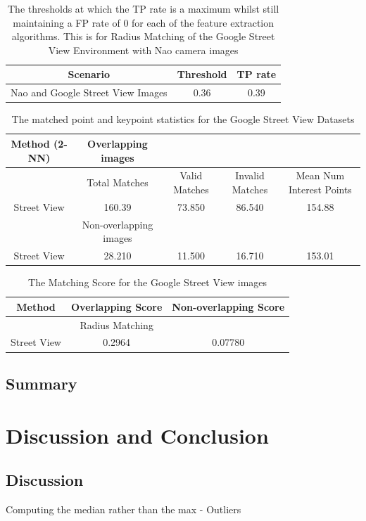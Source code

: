\documentclass[11pt]{report}
\begin{document}
\begin{table}
\caption{The thresholds at which the TP rate is a maximum whilst still maintaining
a FP rate of 0 for each of the feature extraction algorithms. This
is for Radius Matching of the Google Street View Environment with
Nao camera images}
\begin{tabular}{|c|c|c|}
\hline 
Scenario & Threshold & TP rate\tabularnewline
\hline 
\hline 
Nao and Google Street View Images & 0.36 & 0.39\tabularnewline
\hline 
\end{tabular}
\label{tab:tpStreetView}
\end{table}

\begin{table}
\caption{The matched point and keypoint statistics for the Google Street View
Datasets}
\begin{tabular}{|c|c|c|c|c|}
\hline 
Method (2-NN) & Overlapping images &  &  & \tabularnewline
\hline 
\hline 
 & Total Matches & Valid Matches & Invalid Matches & Mean Num Interest Points\tabularnewline
\hline 
Street View  & 160.39 & 73.850 & 86.540 & 154.88\tabularnewline
\hline 
 & Non-overlapping images &  &  & \tabularnewline
\hline 
Street View & 28.210 & 11.500 & 16.710 & 153.01\tabularnewline
\hline 
\end{tabular}
\label{tab:gsMK}
\end{table}

\begin{table}
\caption{The Matching Score for the Google Street View images}
\begin{tabular}{|c|c|c|}
\hline 
Method & Overlapping Score & Non-overlapping Score\tabularnewline
\hline 
\hline 
 & Radius Matching & \tabularnewline
\hline 
Street View & 0.2964 & 0.07780\tabularnewline
\hline 
\end{tabular}
\label{tab:gsMS}
\end{table}

\section{Summary}
\label{sec:summary}

\chapter{Discussion and Conclusion}
\label{sec:discussionConclusion}

\section{Discussion}
\label{sec:discussion}
Computing the median rather than the max - Outliers
\end{document}
